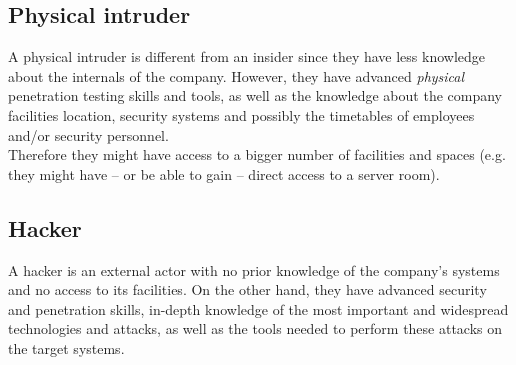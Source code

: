 \subsection*{Physical intruder}
A physical intruder is different from an insider since they have less knowledge about the internals of the company. However, they have advanced \textit{physical} penetration testing skills and tools, as well as the knowledge about the company facilities location, security systems and possibly the timetables of employees and/or security personnel.\\
Therefore they might have access to a bigger number of facilities and spaces (e.g. they might have -- or be able to gain -- direct access to a server room).

\subsection*{Hacker}
A hacker is an external actor with no prior knowledge of the company's systems and no access to its facilities.
On the other hand, they have advanced security and penetration skills, in-depth knowledge of the most important and widespread technologies and attacks, as well as the tools needed to perform these attacks on the target systems.

